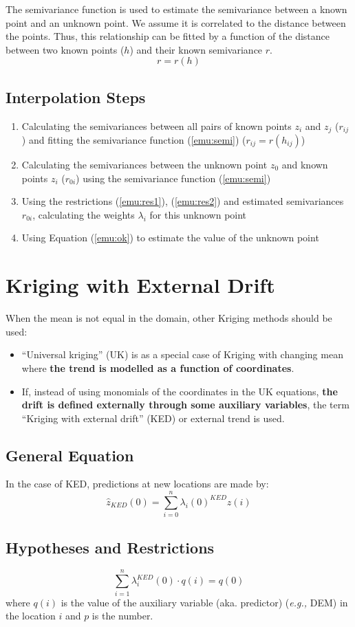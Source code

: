 \documentclass{article}
\begin{document}
The semivariance function is used to estimate the semivariance between a known point and an unknown point. We assume it is correlated to the distance between the points. Thus, this relationship can be fitted by a function of the distance between two known points ($h$) and their known semivariance $r$. 
\begin{equation}
\label{emu:semi}
    r=r(h)
\end{equation}

\subsection{Interpolation Steps}
\begin{enumerate}[1)]
    \item Calculating the semivariances between all pairs of known points $z_i$ and $z_j$ ($r_{ij}$) and fitting the semivariance function (\ref{emu:semi}) ($r_{ij}=r(h_{ij})$)
    \item Calculating the semivariances between the unknown point $z_0$ and known points $z_i$ ($r_{0i}$) using the semivariance function (\ref{emu:semi})
    \item Using the restrictions (\ref{emu:res1}), (\ref{emu:res2}) and estimated semivariances $r_{0i}$, calculating the weights $\lambda_i$ for this unknown point
    \item Using Equation (\ref{emu:ok}) to estimate the value of the unknown point
\end{enumerate}

\section{Kriging with External Drift}

When the mean is not equal in the domain, other Kriging methods should be used:
\begin{itemize}
    \item “Universal kriging” (UK) is as a special case of Kriging with changing mean where \textbf{the trend is modelled as a function of coordinates}. 
    \item If, instead of using monomials of the coordinates in the UK equations, \textbf{the drift is defined externally through some auxiliary variables}, the term “Kriging with external drift” (KED) or external trend is used.
\end{itemize}

\subsection{General Equation}
In the case of KED, predictions at new locations are made by:
\begin{equation}
    \hat{z}_{KED}(0)=\sum_{i=0}^{n}\lambda_i(0)^{KED}z(i)
\end{equation}

\subsection{Hypotheses and Restrictions}
\begin{equation}
    \sum_{i=1}^n\lambda_i^{KED}(0)\cdot q(i)=q(0)
\end{equation}
where $q(i)$ is the value of the auxiliary variable (aka. predictor) (\textit{e.g.,} DEM) in the location $i$ and $p$ is the number.
\end{document}
